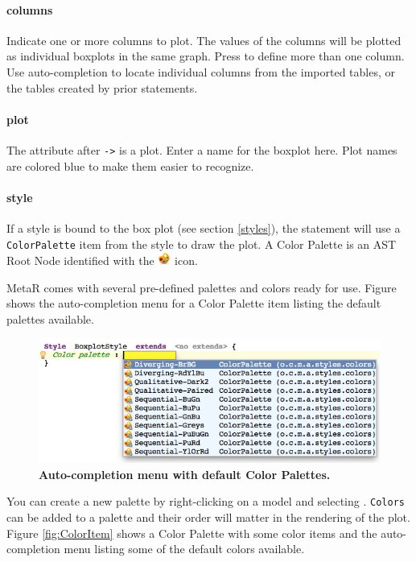 \paragraph{columns}
Indicate one or more columns to plot. The values of the columns will be plotted as individual boxplots in the same graph. Press \keys{\enter} to define more than one column. Use auto-completion to locate individual columns from the imported tables, or the tables created by prior statements. 

\paragraph{plot}
The attribute after \texttt{->} is a plot. Enter a name for the boxplot here. Plot names are colored blue to make them easier to recognize.

\paragraph{style} \label{ColorPaletteDesc}
If a style is bound to the box plot (see section \ref{styles}),  the statement will use a \texttt{Color\allowbreak{}Palette} item from the style to draw the plot. A Color Palette is an AST Root Node identified with the  \includegraphics[height=2ex]{figures/palette.png} icon. 

MetaR comes with several pre-defined palettes and colors ready for use. Figure shows the auto-completion menu for a Color Palette item listing the default palettes available.

\begin{figure}[h!tbp]
  \centering
  \includegraphics[width=\figWidthWide]{figures/ColorPaletteItem.png}
\caption[Color Palette Item.]{\textbf{Auto-completion menu with default Color Palettes.}}
\label{fig:ColorPaletteItem}
\end{figure}

You can create a new palette by right-clicking on a model and selecting . \texttt{Colors} can be added to a palette and their order will matter in the rendering of the plot. Figure \ref{fig:ColorItem} shows a Color Palette with some color items and the auto-completion menu listing some of the default colors available.

